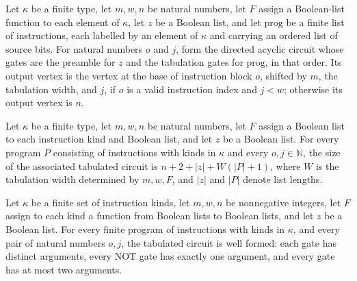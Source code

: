 \begin{definition}
\label{BoolCircuit.tabCircuit}
\leanok
{}
Let $\kappa$ be a finite type, let $m,w,n$ be natural numbers, let $F$ assign a
Boolean-list function to each element of $\kappa$, let $z$ be a Boolean list, and let
$\mathrm{prog}$ be a finite list of instructions, each labelled by an element of
$\kappa$ and carrying an ordered list of source bits. For natural numbers $o$ and $j$,
form the directed acyclic circuit whose gates are the preamble for $z$ and the
tabulation gates for $\mathrm{prog}$, in that order. Its output vertex is the vertex at
the base of instruction block $o$, shifted by $m$, the tabulation width, and $j$, if $o$
is a valid instruction index and $j<w$; otherwise its output vertex is $n$.
\end{definition}

\begin{theorem}
\label{BoolCircuit.tabCircuit_size}
\leanok
{}
Let $\kappa$ be a finite type, let $m,w,n$ be natural numbers, let $F$ assign a Boolean
list to each instruction kind and Boolean list, and let $z$ be a Boolean list. For every
program $P$ consisting of instructions with kinds in $\kappa$ and every
$o,j\in\mathbb{N}$, the size of the associated tabulated circuit is $n+2+|z|+W(|P|+1)$,
where $W$ is the tabulation width determined by $m,w,F$, and $|z|$ and $|P|$ denote list
lengths.
\end{theorem}

\begin{theorem}
\label{BoolCircuit.tabCircuit_isFaninTwo}
\leanok
{}
Let $\kappa$ be a finite set of instruction kinds, let $m,w,n$ be nonnegative integers,
let $F$ assign to each kind a function from Boolean lists to Boolean lists, and let $z$
be a Boolean list. For every finite program of instructions with kinds in $\kappa$, and
every pair of natural numbers $o,j$, the tabulated circuit is well formed: each gate has
distinct arguments, every NOT gate has exactly one argument, and every gate has at most
two arguments.
\end{theorem}

